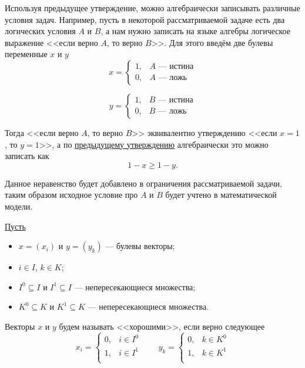 \example

Используя предыдущее утверждение, можно алгебраически записывать различные условия задач. Например, пусть в некоторой рассматриваемой задаче есть два логических условия $A$ и $B$, а нам нужно записать на языке алгебры логическое выражение <<если верно $A$, то верно $B$>>. Для этого введём две булевы переменные $x$ и $y$
\[
x = \begin{cases}
	1, & \text{$A$ --- истина} \\
	0, & \text{$A$ --- ложь}
\end{cases}
\]

\[
y = \begin{cases}
	1, & \text{$B$ --- истина} \\
	0, & \text{$B$ --- ложь}
\end{cases}
\]

Тогда <<если верно $A$, то верно $B$>> эквивалентно утверждению <<если $x = 1$, то $y = 1$>>, а по \hyperref[fact:simple_conditions]{предыдущему утверждению} алгебраически это можно записать как
\[
\boxed{1 - x \ge 1 - y}.
\]

Данное неравенство будет добавлено в ограничения рассматриваемой задачи, таким образом исходное условие про $A$ и $B$ будет учтено в математической модели.

\label{fact:complex_conditions}

\underline{Пусть}
\begin{itemize}[nosep]	
	\item $x = (x_i)$ и $y = (y_k)$ --- булевы векторы;
	
	\item $i \in I$, $k \in K$;
	
	\item $I^0 \subseteq I$ и $I^1 \subseteq I$ --- непересекающиеся множества;
	
	\item $K^0 \subseteq K$ и $K^1 \subseteq K$ --- непересекающиеся множества.
\end{itemize}

Векторы $x$ и $y$ будем называть <<хорошими>>, если верно следующее
\[
x_i = \begin{cases}
	0,& i \in I^0\\
	1,& i \in I^1\\
\end{cases} \qquad y_k = \begin{cases}
0,& k \in K^0\\
1,& k \in K^1\\
\end{cases}
\]

